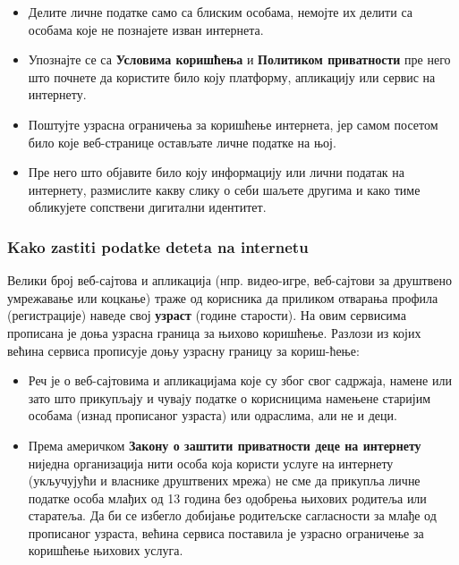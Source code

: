 \documentclass[a4paper]{article}
\begin{document}
\begin{itemize}
	
\item     Делите личне податке само са блиским особама, немојте их делити са особама које не познајете изван интернета.
    
\item     Упознајте се са \textbf{Условима коришћења}\cite{EULA} и \textbf{Политиком приватности}\cite{PP} пре него што почнете да користите било коју платформу, апликацију или сервис на интернету.
    
\item     Поштујте узрасна ограничења за коришћење интернета, јер самом посетом било које веб-странице остављате личне податке на њој.
    
\item      Пре него што објавите било коју информацију или лични податак на интернету, размислите какву слику о себи шаљете другима и како тиме обликујете сопствени дигитални идентитет.
  \end{itemize}  
\subsubsection{Kako zastiti podatke deteta na internetu}

Велики број веб-сајтова и апликација (нпр. видео-игре, веб-сајтови за друштвено умрежавање или коцкање) траже од корисника да приликом отварања профила (регистрације) наведе свој \textbf{узраст} (године старости). На овим сервисима прописана је доња узрасна граница за њихово коришћење.
Разлози из којих већина сервиса прописује доњу узрасну границу за кориш-ћење:

\begin{itemize}

\item   Реч је о веб-сајтовима и апликацијама које су због свог садржаја, намене или зато што прикупљају и чувају податке о корисницима намењене старијим особама (изнад прописаног узраста) или одраслима, али не и деци.

\item   Према америчком \textbf{Закону о заштити приватности деце на интернету}\cite{children privacy} ниједна организација нити особа која користи услуге на интернету (укључујући и власнике друштвених мрежа) не сме да прикупља личне податке особа млађих од 13 година без одобрења њихових родитеља или старатеља. Да би се избегло добијање родитељске сагласности за млађе од прописаног узраста, већина сервиса поставила је узрасно ограничење за коришћење њихових услуга. 

\end{itemize}
\end{document}

